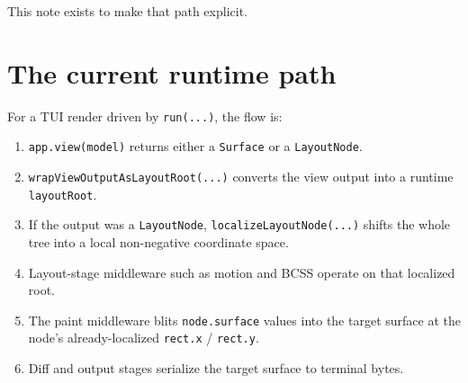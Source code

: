 This note exists to make that path explicit.

\section{The current runtime path}\label{record-049-the-current-runtime-path}

For a TUI render driven by \texttt{r\allowbreak{}u\allowbreak{}n\allowbreak{}(\allowbreak{}.\allowbreak{}.\allowbreak{}.\allowbreak{})}, the flow is:

\begin{enumerate}
\def\labelenumi{\arabic{enumi}.}
\tightlist
\item
  \texttt{a\allowbreak{}p\allowbreak{}p\allowbreak{}.\allowbreak{}v\allowbreak{}i\allowbreak{}e\allowbreak{}w\allowbreak{}(\allowbreak{}m\allowbreak{}o\allowbreak{}d\allowbreak{}e\allowbreak{}l\allowbreak{})} returns either a \texttt{S\allowbreak{}u\allowbreak{}r\allowbreak{}f\allowbreak{}a\allowbreak{}c\allowbreak{}e} or a \texttt{L\allowbreak{}a\allowbreak{}y\allowbreak{}o\allowbreak{}u\allowbreak{}t\allowbreak{}N\allowbreak{}o\allowbreak{}d\allowbreak{}e}.
\item
  \texttt{w\allowbreak{}r\allowbreak{}a\allowbreak{}p\allowbreak{}V\allowbreak{}i\allowbreak{}e\allowbreak{}w\allowbreak{}O\allowbreak{}u\allowbreak{}t\allowbreak{}p\allowbreak{}u\allowbreak{}t\allowbreak{}A\allowbreak{}s\allowbreak{}L\allowbreak{}a\allowbreak{}y\allowbreak{}o\allowbreak{}u\allowbreak{}t\allowbreak{}R\allowbreak{}o\allowbreak{}o\allowbreak{}t\allowbreak{}(\allowbreak{}.\allowbreak{}.\allowbreak{}.\allowbreak{})} converts the view output into a runtime \texttt{l\allowbreak{}a\allowbreak{}y\allowbreak{}o\allowbreak{}u\allowbreak{}t\allowbreak{}R\allowbreak{}o\allowbreak{}o\allowbreak{}t}.
\item
  If the output was a \texttt{L\allowbreak{}a\allowbreak{}y\allowbreak{}o\allowbreak{}u\allowbreak{}t\allowbreak{}N\allowbreak{}o\allowbreak{}d\allowbreak{}e}, \texttt{l\allowbreak{}o\allowbreak{}c\allowbreak{}a\allowbreak{}l\allowbreak{}i\allowbreak{}z\allowbreak{}e\allowbreak{}L\allowbreak{}a\allowbreak{}y\allowbreak{}o\allowbreak{}u\allowbreak{}t\allowbreak{}N\allowbreak{}o\allowbreak{}d\allowbreak{}e\allowbreak{}(\allowbreak{}.\allowbreak{}.\allowbreak{}.\allowbreak{})} shifts the whole tree into a local non-negative coordinate space.
\item
  Layout-stage middleware such as motion and BCSS operate on that localized root.
\item
  The paint middleware blits \texttt{n\allowbreak{}o\allowbreak{}d\allowbreak{}e\allowbreak{}.\allowbreak{}s\allowbreak{}u\allowbreak{}r\allowbreak{}f\allowbreak{}a\allowbreak{}c\allowbreak{}e} values into the target surface at the node's already-localized \texttt{r\allowbreak{}e\allowbreak{}c\allowbreak{}t\allowbreak{}.\allowbreak{}x} / \texttt{r\allowbreak{}e\allowbreak{}c\allowbreak{}t\allowbreak{}.\allowbreak{}y}.
\item
  Diff and output stages serialize the target surface to terminal bytes.
\end{enumerate}

